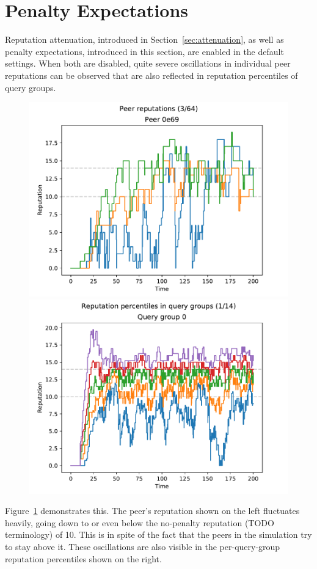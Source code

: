 \section{Penalty Expectations}
\label{sec:penalty_expectations}
Reputation attenuation, introduced in Section~\ref{sec:attenuation}, as well as
penalty expectations, introduced in this section, are enabled in the default
settings. When both are disabled, quite severe oscillations in individual peer
reputations can be observed that are also reflected in reputation percentiles of
query groups.

\begin{figure}[t]
\centering
\includegraphics[width=0.5\columnwidth]{figures/expectations_off_no_att_peer_reps_3_of_64}%
\includegraphics[width=0.5\columnwidth]{figures/expectations_off_no_att_rep_percs_1_of_14}
\label{fig:penalty_expectations_off_no_att_peer_reps_percs}
\end{figure}

Figure~\ref{fig:penalty_expectations_off_no_att_peer_reps_percs} demonstrates
this. The peer's reputation shown on the left fluctuates heavily, going down to
or even below the no-penalty reputation (TODO terminology) of 10. This is in
spite of the fact that the peers in the simulation try to stay above it. These
oscillations are also visible in the per-query-group reputation percentiles
shown on the right.

